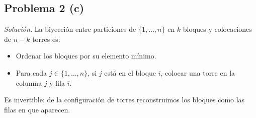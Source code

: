 \subsection*{Problema 2 (c)}
\emph{Solución.}
La biyección entre particiones de \(\{1,\dots,n\}\) en \(k\) bloques y colocaciones de \(n-k\) torres es:
\begin{itemize}
\item Ordenar los bloques por su elemento mínimo.
\item Para cada \(j\in\{1,\dots,n\}\), si \(j\) está en el bloque \(i\), colocar una torre en la columna \(j\) y fila \(i\).
\end{itemize}
Es invertible: de la configuración de torres reconstruimos los bloques como las filas en que aparecen.
